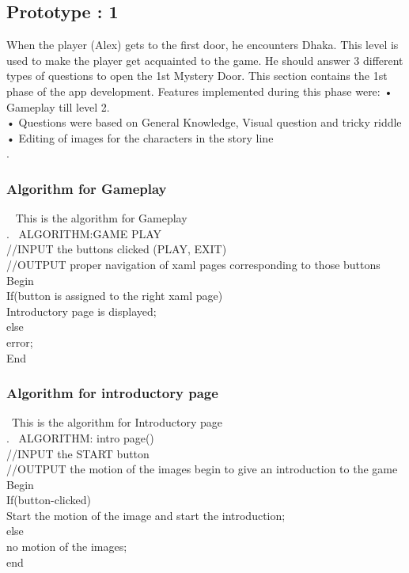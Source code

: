 \subsection{Prototype : 1}
\hspace{1cm}When the player (Alex) gets to the first door, he encounters Dhaka. This level is used to make the player get acquainted to the game.  He should answer 3 different types of questions to open the 1st Mystery Door.
This section contains the 1st phase of the app development. Features implemented during this phase were:
•	Gameplay till level 2.\\
•	Questions were based on General Knowledge, Visual question and tricky riddle\\
•	Editing of images for the characters in the story line\\
\cite{DBLP:journals/ivc/KadyrovP03}.\\

\subsubsection{Algorithm for Gameplay}

\ttfamily\ \hspace{1cm}
This is the algorithm for Gameplay\\
\cite{DBLP:journals/ivc/KadyrovP03}.
\rmfamily\ 
ALGORITHM:GAME PLAY \\
//INPUT the buttons clicked (PLAY, EXIT)\\
//OUTPUT proper navigation of xaml pages corresponding to those buttons\\
Begin\\
If(button is assigned to the right xaml page)\\
Introductory page is displayed;\\
else\\
error;\\
End
\rmfamily

\subsubsection{Algorithm for introductory page}

\ttfamily\ \hspace{1cm}This is the algorithm for Introductory page\\ 
\cite{DBLP:journals/ivc/KadyrovP03}.
\rmfamily\ ALGORITHM: intro page()   \\
//INPUT the START button\\
//OUTPUT the motion of the images begin to give an introduction to the game\\
Begin\\
If(button-clicked)\\
Start the motion of the image and start the introduction;\\
else\\
no motion of the images;\\
end
\rmfamily
